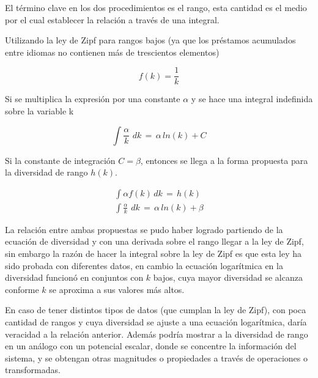 El término clave en los dos procedimientos es el rango, esta cantidad es el medio por el cual establecer la relación a través de una integral.

Utilizando la ley de Zipf para rangos bajos (ya que los préstamos acumulados entre idiomas no contienen más de trescientos elementos)

\begin{equation}
\label{ec.Zipf_kbajos}
f(k)  =  \frac{1}{k} 
\end{equation} 


Si se multiplica la expresión por una constante $\alpha$ y se hace una integral indefinida sobre la variable k

\begin{equation}
\label{ec.Zipf_int}
\int \frac{\alpha}{k}\,\,dk \, = \, \alpha \, ln \left(k\right) + C
\end{equation} 

Si la constante de integración $C = \beta$, entonces se llega a la forma propuesta para la diversidad de rango $h(k)$.  

\begin{subequations}
	\begin{align}
	\label{ec.Zipf_dk}
	\int \alpha f\left(k\right) \,dk \,=\, h(k) \\
	\int \frac{\alpha}{k}\,\,dk \, = \, \alpha \, ln \left(k\right) + \beta	
	\end{align}
\end{subequations}


La relación entre ambas propuestas se pudo haber logrado partiendo de la ecuación de diversidad y con una derivada sobre el rango llegar a la ley de Zipf, sin embargo la razón de hacer la integral sobre la ley de Zipf es que esta ley  ha sido probada con diferentes datos, en cambio la ecuación logarítmica en la diversidad funcionó en conjuntos con $k$ bajos, cuya mayor diversidad se alcanza conforme $k$ se aproxima a sus valores más altos.  

En caso de tener distintos tipos de datos (que cumplan la ley de Zipf), con poca cantidad de rangos y cuya diversidad se ajuste a una ecuación logarítmica, daría veracidad a la relación anterior. Además podría mostrar a la diversidad de rango en un análogo con un potencial escalar, donde se concentre la información del sistema, y se obtengan otras magnitudes o propiedades a través  de operaciones o transformadas. 

 



